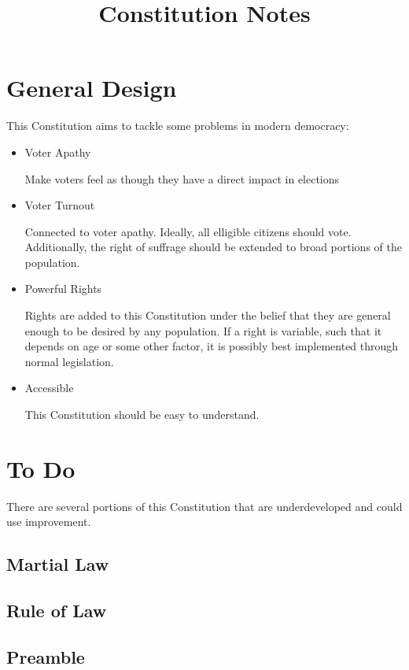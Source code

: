\documentclass{article}
\title{Constitution Notes}
\begin{document}
    \maketitle
    \section*{General Design}
    This Constitution aims to tackle some problems in modern democracy:
    \begin{itemize}
        \item Voter Apathy

            Make voters feel as though they have a direct impact in elections
        \item Voter Turnout

            Connected to voter apathy. Ideally, all elligible citizens should
            vote. Additionally, the right of suffrage should be extended to
            broad portions of the population.
        \item Powerful Rights

            Rights are added to this Constitution under the belief that they
            are general enough to be desired by any population. If a right
            is variable, such that it depends on age or some other factor, it
            is possibly best implemented through normal legislation.
        \item Accessible

            This Constitution should be easy to understand.
    \end{itemize}

    \section*{To Do}

    There are several portions of this Constitution that are underdeveloped and
    could use improvement.

    \subsection*{Martial Law}
    \subsection*{Rule of Law}

    \subsection*{Preamble}
\end{document}

